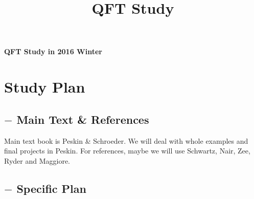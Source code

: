 \documentclass[11pt,letterpaper]{article}
\begin{document}
\univlogo

\title{QFT Study}

{\Huge \bfseries QFT Study in 2016 Winter}\\[3mm]

\section*{Study Plan}

\subsection*{$-$ Main Text \& References}

Main text book is Peskin \& Schroeder. We will deal with whole examples and final projects in Peskin. \newline
For references, maybe we will use Schwartz, Nair, Zee, Ryder and Maggiore.

\subsection*{$-$ Specific Plan}
\end{document}
